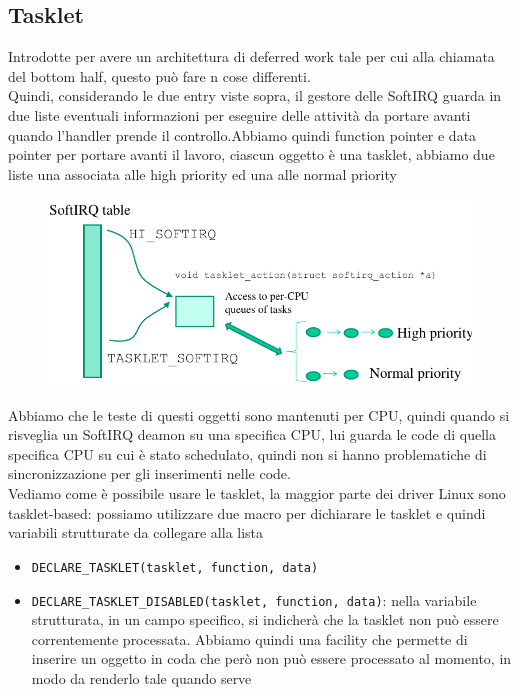 \documentclass[12pt, oneside]{extbook}
\begin{document}
\subsection{Tasklet}
Introdotte per avere un architettura di deferred work tale per cui alla chiamata del bottom half, questo può fare n cose differenti.\\Quindi, considerando le due entry viste sopra, il gestore delle SoftIRQ guarda in due liste eventuali informazioni per eseguire delle attività da portare avanti quando l'handler prende il controllo.Abbiamo quindi function pointer e data pointer per portare avanti il lavoro, ciascun oggetto è una tasklet, abbiamo due liste una associata alle high priority ed una alle normal priority
\begin{figure}[!h]
	\includegraphics[scale=0.3]{immagini/tasklet_queue.png}
\end{figure}
Abbiamo che le teste di questi oggetti sono mantenuti per CPU, quindi quando si risveglia un SoftIRQ deamon su una specifica CPU, lui guarda le code di quella specifica CPU su cui è stato schedulato, quindi non si hanno problematiche di sincronizzazione per gli inserimenti nelle code.\\Vediamo come è possibile usare le tasklet, la maggior parte dei driver Linux sono tasklet-based: possiamo utilizzare due macro per dichiarare le tasklet e quindi variabili strutturate da collegare alla lista
\begin{itemize}
\item \texttt{DECLARE\_TASKLET(tasklet, function, data)}
\item \texttt{DECLARE\_TASKLET\_DISABLED(tasklet, function, data)}: nella variabile strutturata, in un campo specifico, si indicherà che la tasklet non può essere correntemente processata. Abbiamo quindi una facility che permette di inserire un oggetto in coda che però non può essere processato al momento, in modo da renderlo tale quando serve
\end{itemize}
\end{document}
